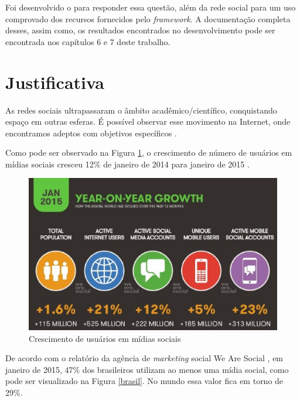 Foi desenvolvido o  para responder essa questão, além da rede social  para um uso comprovado dos recursos fornecidos pelo \textit{framework}. A documentação completa desses, assim como, os resultados encontrados no desenvolvimento pode ser encontrada nos capítulos 6 e 7 deste trabalho.

\section{Justificativa}

As redes sociais ultrapassaram o âmbito acadêmico/científico, conquistando espaço em outras esferas. É possível observar esse movimento na Internet, onde encontramos adeptos com objetivos específicos \cite{Tomae:Alcara:Chiara:2005}.

Como pode ser observado na Figura \ref{crescimento}, o crescimento de número de usuários em mídias sociais cresceu 12\% de janeiro de 2014 para janeiro de 2015 \cite{wearesocial:2015}.

\newpage

\begin{figure}[!h]
	\centering
	\includegraphics[scale=0.5]{figuras/introducao/crescimento.eps}
	\caption[Crescimento de usuários em mídias sociais]{Crescimento de usuários em mídias sociais \cite{wearesocial:2015}}
	\label{crescimento}
\end{figure}

De acordo com o relatório da agência de \textit{marketing} social We Are Social \cite{wearesocial:2015}, em janeiro de 2015, 47\% dos brasileiros utilizam ao menos uma mídia social, como pode ser visualizado na Figura \ref{brasil}. No mundo essa valor fica em torno de 29\%.


